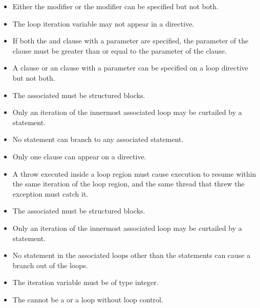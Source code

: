 \begin{itemize}
\item Either the  modifier or the  modifier can be specified but not both.

\item The loop iteration variable may not appear in a  directive.

\item If both the  and  clause with a parameter are specified,
the parameter of the  clause must be greater than or equal to the parameter of the
 clause.

\item A  clause or an  clause with a parameter can be specified on a loop directive but not both.
\end{itemize}

\begin{ccppspecific}
\begin{itemize}
\item The associated  must be structured blocks.

\item Only an iteration of the innermost associated loop may be curtailed by a 
statement.

\item No statement can branch to any associated  statement.

\item Only one  clause can appear on a  directive.

\item A throw executed inside a loop region must cause execution to resume within the
same iteration of the loop region, and the same thread that threw the exception must
catch it.
\end{itemize}
\end{ccppspecific}

\begin{fortranspecific}
\begin{itemize}
\item The associated  must be structured blocks.

\item Only an iteration of the innermost associated loop may be curtailed by a 
statement.

\item No statement in the associated loops other than the  statements can cause a branch
out of the loops.

\item The  iteration variable must be of type integer.

\item The  cannot be a  or a  loop without loop control.
\end{itemize}
\end{fortranspecific}

